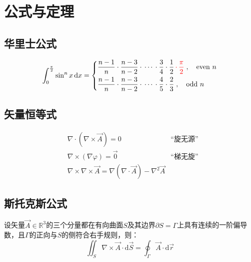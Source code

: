 \section{公式与定理}
    \subsection{华里士公式}
    \begin{equation}
        \int_{0}^{\frac{\pi}{2}}\sin^nx\,\mathrm{d}x=
        \left\{
            \begin{aligned}
                &\frac{n-1}{n}\cdot\frac{n-3}{n-2}\cdot\,\cdots\,\cdot\frac{3}{4}\cdot\frac{1}{2}{\,\color{red}\cdot\,\frac{\pi}{2}}\;,\quad \mathrm{even} ~n\\
                &\frac{n-1}{n}\cdot\frac{n-3}{n-2}\cdot\,\cdots\,\cdot\frac{4}{5}\cdot\frac{2}{3}\;,\quad \mathrm{odd} ~n
            \end{aligned}
        \right.
    \end{equation}

    \subsection{矢量恒等式}
    \begin{subequations}
        \begin{align}
            &\nabla\cdot(\nabla\times\vec{A})=0&\mbox{“旋无源”}\\
            &\nabla\times(\nabla \varphi)=\vec{0}&\mbox{“梯无旋”}\\
            &\nabla\times \nabla\times\vec{A}=\nabla(\nabla\cdot\vec{A})-\nabla^2 \vec{A}&
        \end{align}
    \end{subequations}

    \subsection{斯托克斯公式}
    设矢量$\vec{A}\in \mathbb{R}^3$的三个分量都在有向曲面$S$及其边界$\partial S=\Gamma$上具有连续的一阶偏导数，且$\Gamma$的正向与$S$的侧符合右手规则，则：
    \begin{equation}
        \iint_S \nabla\times\vec{A}\cdot\mathrm{d}\vec{S}
        =\oint_\Gamma \vec{A}\cdot\mathrm{d}\vec{r}
    \end{equation}
